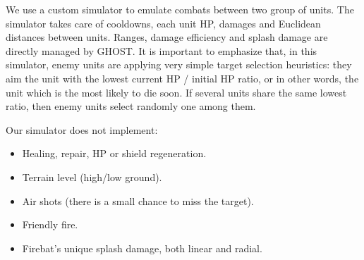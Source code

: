 \documentclass[journal]{IEEEtran}
\newcommand{\minormod}[1]{#1 \xspace}
\newcommand{\ghost}{\textsc{GHOST}\xspace}
\begin{document}
We use a custom simulator to emulate  combats between two group of units. The simulator takes care of
cooldowns,  each  unit HP,  damages and
 Euclidean  distances between units. Ranges,  damage efficiency
and splash damage are directly managed by \ghost.  It is important to
emphasize that, in this simulator, \minormod{enemy units are applying very simple target selection heuristics: they aim the unit with the lowest current HP / initial HP ratio, or in other words, the unit which is the most likely to die soon. If several units share the same lowest ratio, then enemy units select randomly one among them.}

Our simulator does not implement:
\begin{itemize}
\item Healing, repair, HP or shield regeneration.
\item Terrain level (high/low ground).
\item Air shots (there is a small chance to miss the target).
\item Friendly fire.
\item Firebat's unique splash damage, both linear and radial.
\end{itemize}
\end{document}
